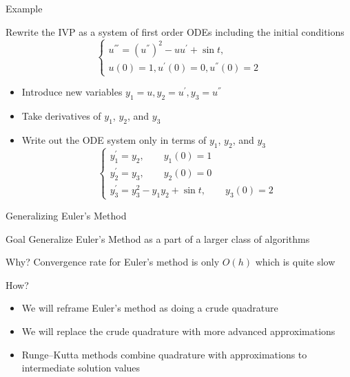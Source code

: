 \documentclass[10pt]{beamer}
\begin{document}
\begin{frame}{Example}
\begin{example}
Rewrite the IVP as a system of first order ODEs including the initial conditions
\[
\begin{cases}
u^{'''} = (u^{''})^2 - u u^\prime + \sin t,\\
u(0) = 1, u^\prime(0) = 0, u^{''}(0) = 2
\end{cases}
\]  
\end{example}
\begin{itemize}
    \item Introduce new variables  $y_1 = u, y_2 = u^\prime, y_3 = u^{''}$
    \item Take derivatives of $y_1$, $y_2$, and $y_3$
    \item Write out the ODE system only in terms of $y_1$, $y_2$, and $y_3$
        \[
        \begin{cases}
        y_1^\prime = y_2, \qquad y_1(0) = 1\\
        y_2^\prime = y_3, \qquad y_2(0) = 0\\
        y_3^\prime = y_3^2 - y_1 y_2 + \sin t, \qquad y_3(0) = 2
        \end{cases}
        \]
\end{itemize}
\end{frame}


\begin{frame}{Generalizing Euler's Method}

\begin{block}{Goal}
  Generalize Euler's Method as a part of a larger class of algorithms
\end{block}

\begin{block}{Why?}
     Convergence rate for Euler's method is only $O(h)$ which is quite slow
\end{block}

\begin{block}{How?}
\begin{itemize}
    \item We will reframe Euler's method as doing a crude quadrature 
    \item We will replace the crude quadrature with more advanced approximations
    \item Runge--Kutta methods combine quadrature with approximations to intermediate solution values
\end{itemize}
\end{block}

\end{frame}
\end{document}
